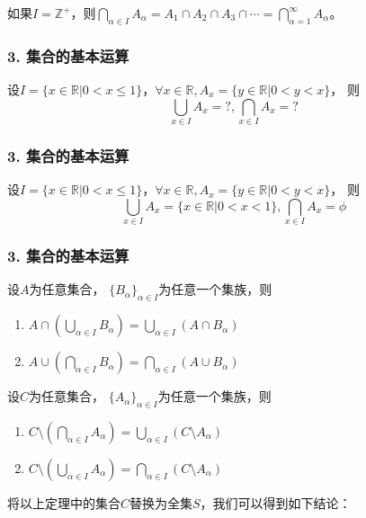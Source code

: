 \documentclass{beamer}
\begin{document}
\begin{CJK*}{UTF8}{gbsn}
\begin{frame}
\begin{Ex}
    如果$I=\mathbb{Z}^+$，则$\bigcap_{\alpha \in I}A_{\alpha} =A_1\cap A_2\cap A_3\cap\cdots=\bigcap_{\alpha=1}^{\infty}A_{\alpha}$。
  \end{Ex}
\end{frame}
\begin{frame}
  \frametitle{3. 集合的基本运算}
  \begin{Ex}
    设$I=\{x \in \mathbb{R} | 0 < x \leq 1\}$，$\forall x \in \mathbb{R}, A_x=\{y\in \mathbb{R}|0 < y < x\}$，
    则
    \begin{equation*}
      \bigcup_{x\in I}A_x=?,
      \bigcap_{x\in I}A_x=?      
    \end{equation*}
  \end{Ex}
\end{frame}
\begin{frame}
  \frametitle{3. 集合的基本运算}
  \begin{Ex}
    设$I=\{x \in \mathbb{R} | 0 < x \leq 1\}$，$\forall x \in \mathbb{R}, A_x=\{y\in \mathbb{R}|0 < y < x\}$，
    则
    \begin{equation*}
      \bigcup_{x\in I}A_x=\{x \in \mathbb{R} | 0 < x < 1\},
      \bigcap_{x\in I}A_x=\phi     
    \end{equation*}
  \end{Ex}
\end{frame}
\begin{frame}
  \frametitle{3. 集合的基本运算}
\begin{Thm}
设$A$为任意集合， $\{B_{\alpha}\}_{\alpha \in I}$为任意一个集族，则
\begin{enumerate}
\item $A \cap (\bigcup_{\alpha \in I}B_{\alpha}) = \bigcup_{\alpha \in I}(A \cap B_{\alpha})$
\item $A \cup (\bigcap_{\alpha \in I}B_{\alpha}) = \bigcap_{\alpha \in I}(A \cup B_{\alpha})$
\end{enumerate}
\end{Thm}
\begin{Thm}
  设$C$为任意集合， $\{A_{\alpha}\}_{\alpha \in I}$为任意一个集族，则
  \begin{enumerate}
  \item $C\setminus(\bigcap_{\alpha \in I}A_{\alpha})=\bigcup_{\alpha\in I}(C\setminus A_{\alpha})$
  \item $C\setminus(\bigcup_{\alpha \in I}A_{\alpha})=\bigcap_{\alpha\in I}(C\setminus A_{\alpha})$
  \end{enumerate}
  \end{Thm}
  将以上定理中的集合$C$替换为全集$S$，我们可以得到如下结论：

\end{frame}
\end{CJK*}
\end{document}
